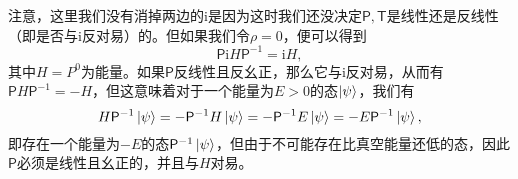 注意，这里我们没有消掉两边的$\mathrm{i}$是因为这时我们还没决定$\mathsf{P} ,\mathsf{T}$是线性还是反线性（即是否与$\mathrm{i}$反对易）的。但如果我们令$\rho =0$，便可以得到
\begin{equation*}
	\mathsf{P}\mathrm{i} H\mathsf{P}^{-1} =\mathrm{i} H,
\end{equation*}
其中$H=P^{0}$为能量。如果$\mathsf{P}$反线性且反幺正，那么它与$\mathrm{i}$反对易，从而有$\mathsf{P} H\mathsf{P}^{-1} =-H$，但这意味着对于一个能量为$E >0$的态$\ket{\psi }$，我们有
\begin{equation*}
	H\mathsf{P}^{-1}\ket{\psi } =-\mathsf{P}^{-1} H\ket{\psi } =-\mathsf{P}^{-1} E\ket{\psi } =-E\mathsf{P}^{-1}\ket{\psi } ,
\end{equation*}
即存在一个能量为$-E$的态$\mathsf{P}^{-1}\ket{\psi }$，但由于不可能存在比真空能量还低的态，因此$\mathsf{P}$必须是线性且幺正的，并且与$H$对易。

